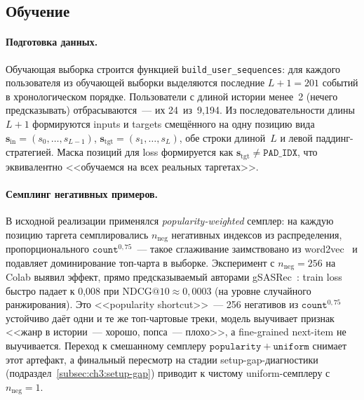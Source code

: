 \subsection{Обучение}\label{subsec:ch3:scorer-train}

\paragraph{Подготовка данных.} Обучающая выборка строится функцией \texttt{build\_user\_sequences}: для каждого пользователя из обучающей выборки выделяются последние $L + 1 = 201$ событий в хронологическом порядке. Пользователи с длиной истории менее~2 (нечего предсказывать) отбрасываются~--- их 24~из~9{,}194. Из последовательности длины $L + 1$ формируются inputs и targets смещённого на одну позицию вида $\mathbf{s}_{\mathrm{in}} = (s_0, \ldots, s_{L-1})$, $\mathbf{s}_{\mathrm{tgt}} = (s_1, \ldots, s_L)$, обе строки длиной~$L$ и левой паддинг-стратегией. Маска позиций для loss формируется как $\mathbf{s}_{\mathrm{tgt}} \neq \mathtt{PAD\_IDX}$, что эквивалентно <<обучаемся на всех реальных таргетах>>.

\paragraph{Семплинг негативных примеров.} В исходной реализации применялся \emph{popularity-weighted} семплер: на каждую позицию таргета семплировались $n_{\mathrm{neg}}$ негативных индексов из распределения, пропорционального $\mathtt{count}^{0{,}75}$~--- такое сглаживание заимствовано из word2vec~\cite{koren2009matrix} и подавляет доминирование топ-чарта в выборке. Эксперимент с $n_{\mathrm{neg}} = 256$ на Colab выявил эффект, прямо предсказываемый авторами gSASRec~\cite{gsasrec2023}: train loss быстро падает к 0{,}008 при $\mathrm{NDCG@10} \approx 0{,}0003$ (на уровне случайного ранжирования). Это <<popularity shortcut>>~--- 256 негативов из $\mathtt{count}^{0{,}75}$ устойчиво даёт одни и те же топ-чартовые треки, модель выучивает признак <<жанр в истории~--- хорошо, попса~--- плохо>>, а fine-grained next-item не выучивается. Переход к смешанному семплеру $\mathtt{popularity} + \mathtt{uniform}$ снимает этот артефакт, а финальный пересмотр на стадии setup-gap-диагностики (подраздел~\ref{subsec:ch3:setup-gap}) приводит к чистому uniform-семплеру с $n_{\mathrm{neg}} = 1$.

